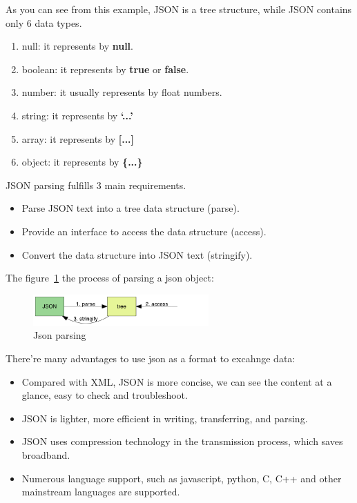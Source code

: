 \documentclass[11pt]{book}
\begin{document}
As you can see from this example, JSON is a tree structure, while JSON contains only 6 data types.
\begin{enumerate}
	\item null: it represents by \textbf{null}.
 \item boolean: it represents by \textbf{true} or \textbf{false}.
 \item number: it usually represents by float numbers.
 \item string: it represents by \textbf{`...'}
 \item array: it represents by \textbf{[...]}
 \item object: it represents by \textbf{\{...\}}
\end{enumerate}
JSON parsing fulfills 3 main requirements.
\begin{itemize}
	\item Parse JSON text into a tree data structure (parse).
	\item Provide an interface to access the data structure (access).
 \item Convert the data structure into JSON text (stringify).
\end{itemize}
The figure~\ref{fig:json} the process of parsing a json object:
\begin{center}
	\begin{figure}[h]
			\centering
			\includegraphics[width=0.6\textwidth]{json}
			\caption{Json parsing}
			\label{fig:json}
	\end{figure}
	\end{center} 
There're many advantages to use json as a format to excahnge data:
\begin{itemize}
	\item Compared with XML, JSON is more concise, we can see the content at a glance, easy to check and troubleshoot.
	\item JSON is lighter, more efficient in writing, transferring, and parsing.
	\item JSON uses compression technology in the transmission process, which saves broadband.
	\item Numerous language support, such as javascript, python, C, C++ and other mainstream languages are supported.
\end{itemize}
\end{document}
